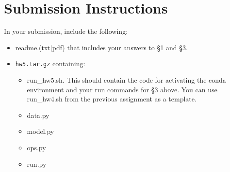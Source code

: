 \documentclass[11pt]{article}
\begin{document}
\section*{Submission Instructions}

In your submission, include the following:
\begin{itemize}
  \item readme.(txt$\mid$pdf) that includes your answers to \S1 and \S3. 
  \item \texttt{hw5.tar.gz} containing:
  \begin{itemize}
    \item run\_hw5.sh.  This should contain the code for activating the conda environment and your run commands for \S3 above.  You can use run\_hw4.sh from the previous assignment as a template.
    \item data.py
    \item model.py
    \item ops.py
    \item run.py
  \end{itemize}
\end{itemize}
\end{document}
